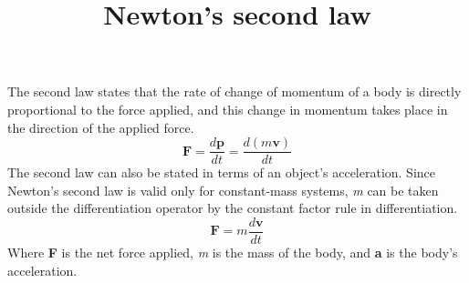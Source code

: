 \documentclass{article}
\begin{document}
\title{\bfseries Newton's second law}
\maketitle
The second law states that the rate of change of momentum of a body is directly proportional to the force applied, and this change in momentum takes place in the direction of the applied force.
$$\mathbf F=\frac {d \mathbf p} {dt}= \frac {d(m \mathbf v)} {dt}$$
The second law can also be stated in terms of an object's acceleration. Since Newton's second law is valid only for constant-mass systems, {\itshape m} can be taken outside the differentiation operator by the constant factor rule in differentiation.
$$ \mathbf F=m \frac{d \mathbf v} {dt}  $$
Where {\bfseries F} is the net force applied,  {\itshape m} is the mass of the body, and {\bfseries a} is the body's acceleration.
 
\end{document}
